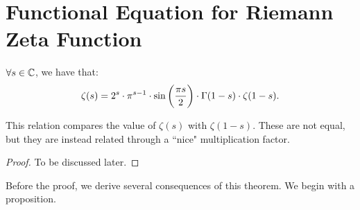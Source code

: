 \setcounter{section}{0}
\setcounter{theorem}{0}


\section{Functional Equation for Riemann Zeta Function}


\begin{theorem}\label{thm:r-func-eq}
$\forall s \in \mathbb{C}$, we have that:
\begin{align*}
    \zeta(s) = 2^s \cdot \pi^{s-1} \cdot \sin\left( \frac{\pi s}{2} \right) \cdot \Gamma(1-s) \cdot \zeta(1-s).
\end{align*}

\end{theorem}

\begin{note}
This relation compares the value of $\zeta(s) $ with $\zeta (1-s)$. These are not equal, but they are instead related through a ``nice" multiplication factor.
\end{note}

\begin{proof}
To be discussed later.
\end{proof}

Before the proof, we derive several consequences of this theorem. We begin with a proposition.



